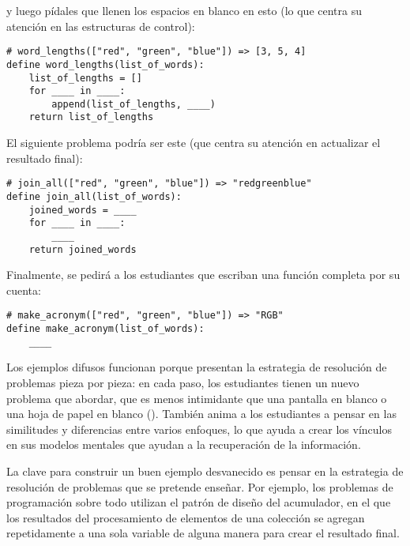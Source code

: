 \noindent

y luego pídales que llenen los espacios en blanco en esto 
(lo que centra su atención en las estructuras de control):


\begin{verbatim}
# word_lengths(["red", "green", "blue"]) => [3, 5, 4]
define word_lengths(list_of_words):
    list_of_lengths = []
    for ____ in ____:
        append(list_of_lengths, ____)
    return list_of_lengths
\end{verbatim}

El siguiente problema podría ser este 
(que centra su atención en actualizar el resultado final):

\begin{verbatim}
# join_all(["red", "green", "blue"]) => "redgreenblue"
define join_all(list_of_words):
    joined_words = ____
    for ____ in ____:
        ____
    return joined_words
\end{verbatim}

Finalmente, se pedirá a los estudiantes que escriban una función completa por su cuenta:

\begin{verbatim}
# make_acronym(["red", "green", "blue"]) => "RGB"
define make_acronym(list_of_words):
    ____
\end{verbatim}

Los ejemplos difusos funcionan porque 
presentan la estrategia de resolución de problemas pieza por pieza: 
en cada paso, 
los estudiantes tienen un nuevo problema que abordar, 
que es menos intimidante que una pantalla en blanco o una hoja de papel en blanco (). 
También anima a los estudiantes a pensar en las similitudes y diferencias entre varios enfoques, 
lo que ayuda a crear los vínculos en sus modelos mentales que ayudan a la recuperación de la información.

La clave para construir un buen ejemplo desvanecido es 
pensar en la estrategia de resolución de problemas que se pretende enseñar. 
Por ejemplo, 
los problemas de programación sobre todo utilizan el patrón de diseño del acumulador, 
en el que los resultados del procesamiento de elementos de una colección 
se agregan repetidamente a una sola variable de alguna manera para crear el resultado final.



